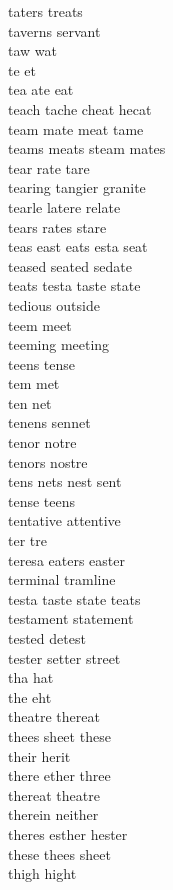 taters treats\\
taverns servant\\
taw wat\\
te et\\
tea ate eat\\
teach tache cheat hecat\\
team mate meat tame\\
teams meats steam mates\\
tear rate tare\\
tearing tangier granite\\
tearle latere relate\\
tears rates stare\\
teas east eats esta seat\\
teased seated sedate\\
teats testa taste state\\
tedious outside\\
teem meet\\
teeming meeting\\
teens tense\\
tem met\\
ten net\\
tenens sennet\\
tenor notre\\
tenors nostre\\
tens nets nest sent\\
tense teens\\
tentative attentive\\
ter tre\\
teresa eaters easter\\
terminal tramline\\
testa taste state teats\\
testament statement\\
tested detest\\
tester setter street\\
tha hat\\
the eht\\
theatre thereat\\
thees sheet these\\
their herit\\
there ether three\\
thereat theatre\\
therein neither\\
theres esther hester\\
these thees sheet\\
thigh hight\\
